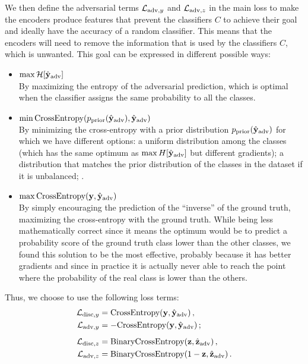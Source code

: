 We then define the adversarial terms $\mathcal{L}_{\textrm{adv},y}$ and $\mathcal{L}_{\textrm{adv},z}$ in the main loss to make the encoders produce features that prevent the classifiers $C$ to achieve their goal and ideally have the accuracy of a random classifier. This means that the encoders will need to remove the information that is used by the classifiers $C$, which is unwanted. This goal can be expressed in different possible ways:
\begin{itemize}
    \item $\max \mathcal{H}[\hat{\mathbf{y}}_\textrm{adv}]$ \\
    By maximizing the entropy of the adversarial prediction, which is optimal when the classifier assigns the same probability to all the classes.
    \item $\min \textrm{CrossEntropy}(p_\mathrm{prior}(\hat{\mathbf{y}}_\textrm{adv}), \hat{\mathbf{y}}_\textrm{adv})$\\
    By minimizing the cross-entropy with a prior distribution $p_\mathrm{prior}(\hat{\mathbf{y}}_\textrm{adv})$ for which we have different options: a uniform distribution among the classes (which has the same optimum as $\max H[\hat{\mathbf{y}}_\textrm{adv}]$ but different gradients); a distribution that matches the prior distribution of the classes in the dataset if it is unbalanced; \etc.
    \item $\max \textrm{CrossEntropy}(\mathbf{y}, \hat{\mathbf{y}}_\textrm{adv})$\\
    By simply encouraging the prediction of the ``inverse'' of the ground truth, \ie maximizing the cross-entropy with the ground truth. While being less mathematically correct since it means the optimum would be to predict a probability score of the ground truth class lower than the other classes, we found this solution to be  the most effective, probably because it has better gradients and since in practice it is actually never able to reach the point where the probability of the real class is lower than the others.
\end{itemize}

Thus, we choose to use the following loss terms:
\begin{align}
    \mathcal{L}_{\textrm{disc},y} &= \textrm{CrossEntropy}(\mathbf{y}, \hat{\mathbf{y}}_\textrm{adv}) \,,    \\
    \mathcal{L}_{\textrm{adv},y} &= -\textrm{CrossEntropy}(\mathbf{y}, \hat{\mathbf{y}}_\textrm{adv}) \,;   \\[0.5em]
    \mathcal{L}_{\textrm{disc},z} &= \textrm{BinaryCrossEntropy}(\mathbf{z}, \hat{\mathbf{z}}_\textrm{adv}) \,,\\
    \mathcal{L}_{\textrm{adv},z} &= \textrm{BinaryCrossEntropy}(1-\mathbf{z}, \hat{\mathbf{z}}_\textrm{adv}) \,.
\end{align}

